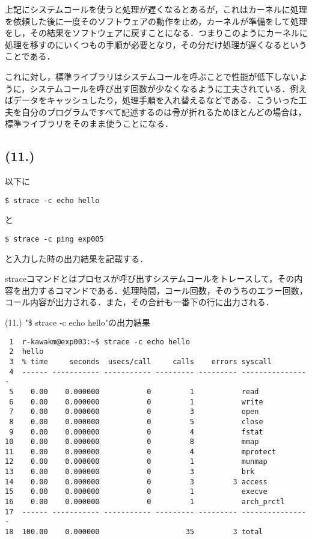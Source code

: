 \documentclass[a4j]{jarticle}
\newenvironment{bit}{\begin{breakitembox}}{\end{breakitembox}} %
\begin{document}
上記にシステムコールを使うと処理が遅くなるとあるが，これはカーネルに処理を依頼した後に一度そのソフトウェアの動作を止め，カーネルが準備をして処理をし，その結果をソフトウェアに戻すことになる．つまりこのようにカーネルに処理を移すのにいくつもの手順が必要となり，その分だけ処理が遅くなるということである．

これに対し，標準ライブラリはシステムコールを呼ぶことで性能が低下しないように，システムコールを呼び出す回数が少なくなるように工夫されている．例えばデータをキャッシュしたり，処理手順を入れ替えるなどである．こういった工夫を自分のプログラムですべて記述するのは骨が折れるためほとんどの場合は，標準ライブラリをそのまま使うことになる．

\subsection{(11.)}

以下に
\begin{verbatim}
$ strace -c echo hello
\end{verbatim}
と
\begin{verbatim}
$ strace -c ping exp005
\end{verbatim}
と入力した時の出力結果を記載する．

straceコマンドとはプロセスが呼び出すシステムコールをトレースして，その内容を出力するコマンドである．処理時間，コール回数，そのうちのエラー回数，コール内容が出力される．また，その合計も一番下の行に出力される．

\begin{bit}[l]{(11.) "\$ strace -c echo hello"の出力結果}
\small{
\begin{verbatim}
 1	r-kawakm@exp003:~$ strace -c echo hello
 2	hello
 3	% time     seconds  usecs/call     calls    errors syscall
 4	------ ----------- ----------- --------- --------- ----------------
 5	  0.00    0.000000           0         1           read
 6	  0.00    0.000000           0         1           write
 7	  0.00    0.000000           0         3           open
 8	  0.00    0.000000           0         5           close
 9	  0.00    0.000000           0         4           fstat
10	  0.00    0.000000           0         8           mmap
11	  0.00    0.000000           0         4           mprotect
12	  0.00    0.000000           0         1           munmap
13	  0.00    0.000000           0         3           brk
14	  0.00    0.000000           0         3         3 access
15	  0.00    0.000000           0         1           execve
16	  0.00    0.000000           0         1           arch_prctl
17	------ ----------- ----------- --------- --------- ----------------
18	100.00    0.000000                    35         3 total
\end{verbatim}
}
\end{bit}
\end{document}
